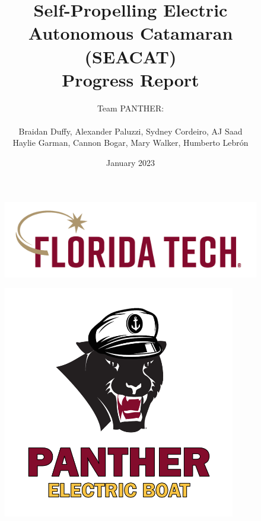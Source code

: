 \documentclass{article}
\title{Self-Propelling Electric Autonomous Catamaran (SEACAT) \\
Progress Report}
\author{
    Team PANTHER:\\ \\
    Braidan Duffy, Alexander Paluzzi, Sydney Cordeiro, AJ Saad\\ 
    Haylie Garman, Cannon Bogar, Mary Walker, Humberto Lebrón }
\date{January 2023}
\begin{document}
    \begin{figure}[t]
        \centering
        \includegraphics[width=5.0in]{images/FloridaTechLogo.png}
        \end{figure} 
   
    \begin{figure}[bt]
        \centering
        \includegraphics[width=4.0in]{images/panther-boat-logo-v6.png}
        \end{figure}

\maketitle
\pagebreak


\tableofcontents 
\pagebreak
\end{document}
